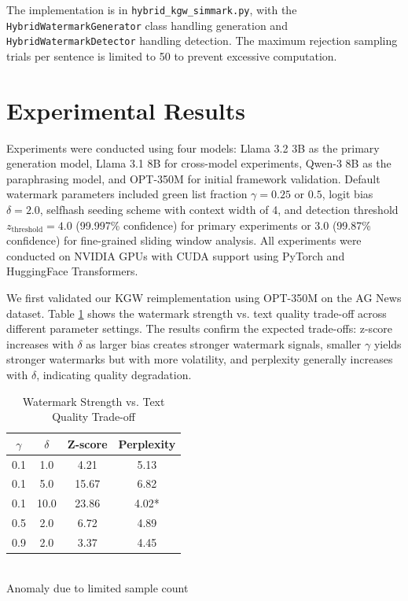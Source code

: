 \documentclass[12pt,letterpaper]{article}
\begin{document}
The implementation is in \texttt{hybrid\_kgw\_simmark.py}, with the \texttt{HybridWatermarkGenerator} class handling generation and \texttt{HybridWatermarkDetector} handling detection. The maximum rejection sampling trials per sentence is limited to 50 to prevent excessive computation.

\section{Experimental Results}

Experiments were conducted using four models: Llama 3.2 3B as the primary generation model, Llama 3.1 8B for cross-model experiments, Qwen-3 8B as the paraphrasing model, and OPT-350M for initial framework validation. Default watermark parameters included green list fraction $\gamma = 0.25$ or $0.5$, logit bias $\delta = 2.0$, selfhash seeding scheme with context width of 4, and detection threshold $z_{\text{threshold}} = 4.0$ (99.997\% confidence) for primary experiments or $3.0$ (99.87\% confidence) for fine-grained sliding window analysis. All experiments were conducted on NVIDIA GPUs with CUDA support using PyTorch and HuggingFace Transformers.

We first validated our KGW reimplementation using OPT-350M on the AG News dataset. Table \ref{tab:tradeoff} shows the watermark strength vs. text quality trade-off across different parameter settings. The results confirm the expected trade-offs: z-score increases with $\delta$ as larger bias creates stronger watermark signals, smaller $\gamma$ yields stronger watermarks but with more volatility, and perplexity generally increases with $\delta$, indicating quality degradation.

\begin{table}[H]
\centering
\caption{Watermark Strength vs. Text Quality Trade-off}
\begin{tabular}{cccc}
\toprule
$\gamma$ & $\delta$ & Z-score & Perplexity \\
\midrule
0.1 & 1.0 & 4.21 & 5.13 \\
0.1 & 5.0 & 15.67 & 6.82 \\
0.1 & 10.0 & 23.86 & 4.02* \\
0.5 & 2.0 & 6.72 & 4.89 \\
0.9 & 2.0 & 3.37 & 4.45 \\
\bottomrule
\end{tabular}
\label{tab:tradeoff}
\\
\small *Anomaly due to limited sample count
\end{table}
\end{document}
